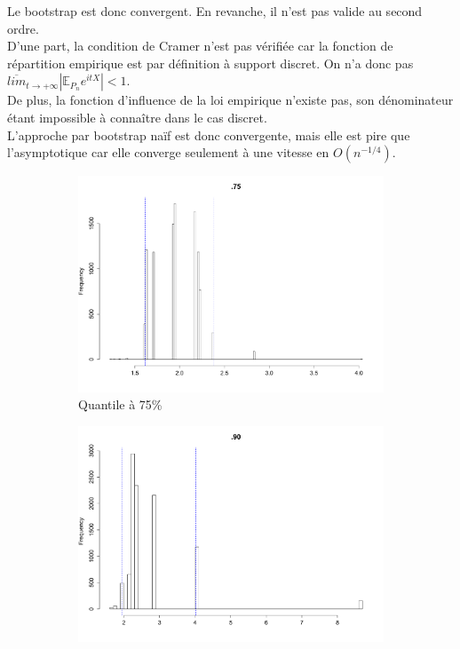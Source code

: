 \documentclass{article}
\renewcommand*{\(}{ \left( }
\renewcommand*{\)}{ \right) }
\begin{document}
Le bootstrap est donc convergent. En revanche, il n'est pas valide au second ordre. \\
D'une part, la condition de Cramer n'est pas vérifiée car la fonction de répartition empirique est par définition à support discret. On n'a donc pas $\overline{lim}_{t\rightarrow+\infty}|\mathbb{E}_{P_n}e^{itX}|<1$.\\
De plus, la fonction d'influence de la loi empirique n'existe pas, son dénominateur étant impossible à connaître dans le cas discret.\\

L'approche par bootstrap naïf est donc convergente, mais elle est pire que l'asymptotique car elle converge seulement à une vitesse en $O(n^{-1/4})$.

\begin{figure}[H]
    \centering
    \begin{subfigure}[t]{0.3\textwidth}
        \includegraphics[width = \linewidth]{img/BootstrapNaif-75-30.pdf}
        \caption{Quantile à 75\%}
        \label{fig:naifB75}
    \end{subfigure}%
    \begin{subfigure}[t]{0.3\textwidth}
        \includegraphics[width = \linewidth]{img/BootstrapNaif-90-30.pdf}

\end{subfigure}
\end{figure}
\end{document}
